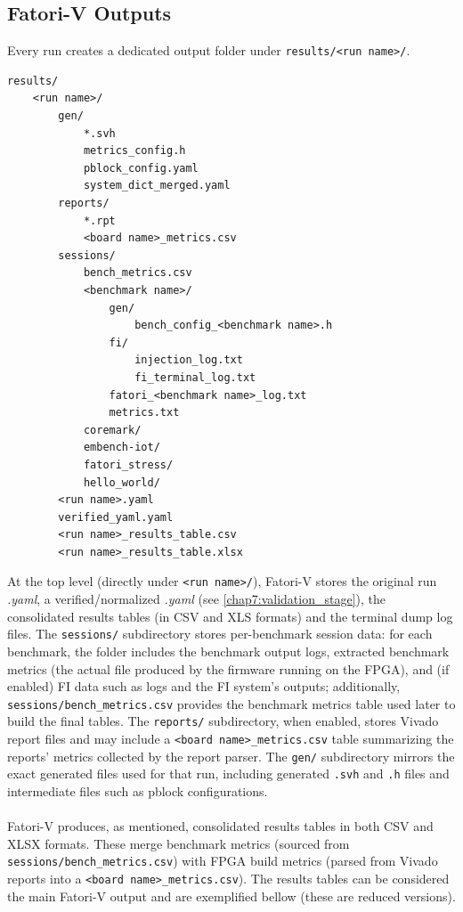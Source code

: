 \subsection{Fatori-V Outputs}
\label{chap3:ui_results}

 Every run creates a dedicated output folder under \texttt{results/\textless run name\textgreater/}.

\begin{lstlisting}[basicstyle=\ttfamily\footnotesize,caption={Results folder, the output of Fatori-V}]
results/
    <run name>/
        gen/
            *.svh
            metrics_config.h
            pblock_config.yaml
            system_dict_merged.yaml
        reports/
            *.rpt
            <board name>_metrics.csv
        sessions/
            bench_metrics.csv
            <benchmark name>/
                gen/
                    bench_config_<benchmark name>.h
                fi/
                    injection_log.txt
                    fi_terminal_log.txt
                fatori_<benchmark name>_log.txt
                metrics.txt
            coremark/
            embench-iot/
            fatori_stress/
            hello_world/
        <run name>.yaml
        verified_yaml.yaml
        <run name>_results_table.csv
        <run name>_results_table.xlsx    
\end{lstlisting}

 At the top level (directly under \texttt{\textless run name\textgreater/}), Fatori-V stores the original run \textit{.yaml}, a verified/normalized \textit{.yaml} (see \cref{chap7:validation_stage}), the consolidated results tables (in CSV and XLS formats) and the terminal dump log files. The \texttt{sessions/} subdirectory stores per-benchmark session data: for each benchmark, the folder includes the benchmark output logs, extracted benchmark metrics (the actual file produced by the firmware running on the FPGA), and (if enabled) \ac{FI} data such as logs and the \ac{FI} system's outputs; additionally, \texttt{sessions/bench\_metrics.csv} provides the benchmark metrics table used later to build the final tables. The \texttt{reports/} subdirectory, when enabled, stores Vivado report files and may include a \texttt{\textless board name\textgreater\_metrics.csv} table summarizing the reports' metrics collected by the report parser. The \texttt{gen/} subdirectory mirrors the exact generated files used for that run, including generated \texttt{.svh} and \texttt{.h} files and intermediate files such as pblock configurations.\\\\
\ac{Fatori-V} produces, as mentioned, consolidated results tables in both CSV and XLSX formats. These merge benchmark metrics (sourced from \texttt{sessions/bench\_metrics.csv}) with \ac{FPGA} build metrics (parsed from Vivado reports into a \texttt{\textless board name\textgreater\_metrics.csv}). The results tables can be considered the main \ac{Fatori-V} output and are exemplified bellow (these are reduced versions).

